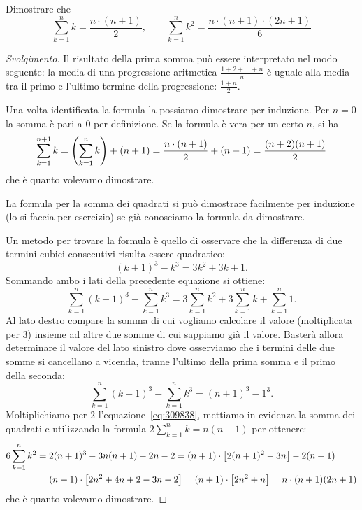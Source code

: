 \begin{exercise}
  \label{ex:somma_lineare}%
  Dimostrare che 
  \[
    \sum_{k=1}^n k = \frac{n\cdot (n+1)}{2}, \qquad
    \sum_{k=1}^n k^2 = \frac{n\cdot (n+1)\cdot (2n+1)}{6}
  \]
\end{exercise}
\begin{proof}[Svolgimento]
Il risultato della prima somma può essere interpretato nel modo seguente:
la media di una progressione aritmetica $\frac{1+2+ \dots + n}{n}$ 
è uguale alla media tra il primo 
e l'ultimo termine della progressione: $\frac{1+n}{2}$.

Una volta identificata la formula la possiamo dimostrare per induzione.
Per $n=0$ la somma è pari a $0$ per definizione.
Se la formula è vera per un certo $n$, si ha 
\[
  \sum_{k=1}^{n+1} k = {\left( \sum_{k=1}^n k \right)} + (n+1)
   = \frac{n\cdot(n+1)}{2} + (n+1) 
   = \frac{(n+2)(n+1)}{2}
\]
che è quanto volevamo dimostrare.

La formula per la somma dei quadrati si può dimostrare facilmente per 
induzione (lo si faccia per esercizio) se già conosciamo la formula da 
dimostrare.

Un metodo per trovare la formula è quello di osservare che la differenza 
di due termini cubici consecutivi risulta essere quadratico:
\[
(k+1)^3 - k^3 = 3 k^2 + 3k + 1.  
\]
Sommando ambo i lati della precedente equazione si ottiene:
\begin{equation}\label{eq:309838}
\sum_{k=1}^n (k+1)^3 - \sum_{k=1}^n k^3 
= 3\sum_{k=1}^n k^2+3\sum_{k=1}^n k+\sum_{k=1}^n 1.
\end{equation}
Al lato destro compare la somma di cui vogliamo calcolare il valore 
(moltiplicata per $3$)
insieme ad altre due somme di cui sappiamo già il valore. 
Basterà allora determinare il valore del lato sinistro dove 
osserviamo che i termini delle due somme si cancellano 
a vicenda,
tranne l'ultimo della prima somma 
e il primo della seconda: 
\[
  \sum_{k=1}^n(k+1)^3 - \sum_{k=1}^n k^3 = (n+1)^3 - 1^3.
\]
Moltiplichiamo per $2$ l'equazione~\eqref{eq:309838},
mettiamo in evidenza la somma dei quadrati e 
utilizzando la formula $2\sum_{k=1}^n k = n(n+1)$
per ottenere:
\begin{align*}
  6 \sum_{k=1}^n k^2 
  &=  2(n+1)^3 - 3 n(n+1) - 2n - 2
  = (n+1) \cdot {\left[ 2(n+1)^2 - 3n \right]} - 2(n+1)\\
  &= (n+1)\cdot {\left[ 2n^2+4n+2 -3n - 2 \right]}
   = (n+1)\cdot {\left[ 2n^2+n \right]} 
   = n \cdot (n+1)(2n+1)
\end{align*}
che è quanto volevamo dimostrare.
\end{proof}

